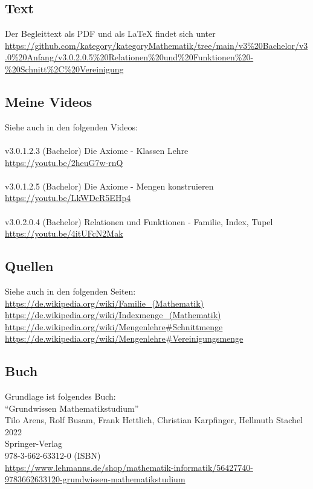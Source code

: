 \documentclass[a4paper]{amsart}
\theoremstyle{definition}
\begin{document}
\subsection*{Text}
Der Begleittext als PDF und als LaTeX findet sich unter
{\tiny
   \url{https://github.com/kategory/kategoryMathematik/tree/main/v3%20Bachelor/v3.0%20Anfang/v3.0.2.0.5%20Relationen%20und%20Funktionen%20-%20Schnitt%2C%20Vereinigung}
}

\subsection*{Meine Videos}
Siehe auch in den folgenden Videos:\\
\\
v3.0.1.2.3 (Bachelor) Die Axiome - Klassen Lehre\\
\url{https://youtu.be/2heuG7w-rnQ}\\
\\
v3.0.1.2.5 (Bachelor) Die Axiome - Mengen konstruieren\\
\url{https://youtu.be/LkWDcR5EHp4}\\
\\
v3.0.2.0.4 (Bachelor) Relationen und Funktionen - Familie, Index, Tupel\\
\url{https://youtu.be/4itUFcN2Mak}

\subsection*{Quellen}
Siehe auch in den folgenden Seiten:\\
\url{https://de.wikipedia.org/wiki/Familie_(Mathematik)}\\
\url{https://de.wikipedia.org/wiki/Indexmenge_(Mathematik)}\\
\url{https://de.wikipedia.org/wiki/Mengenlehre#Schnittmenge}\\
\url{https://de.wikipedia.org/wiki/Mengenlehre#Vereinigungsmenge}

\subsection*{Buch}
Grundlage ist folgendes Buch:\\
"`Grundwissen Mathematikstudium"'\\
Tilo Arens, Rolf Busam, Frank Hettlich, Christian Karpfinger, Hellmuth Stachel \\
2022\\
Springer-Verlag\\
978-3-662-63312-0 (ISBN)\\
{\tiny
   \url{https://www.lehmanns.de/shop/mathematik-informatik/56427740-9783662633120-grundwissen-mathematikstudium}}\\
\\
\end{document}
